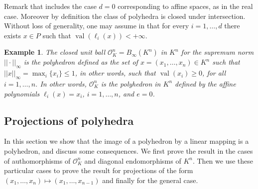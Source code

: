 \documentclass[a4paper,oneside,11pt]{article}
\newtheorem{example}[theorem]{Example}
\newcommand{\aff}[1]{{\text{aff}(#1)}} %
\newcommand{\relint}[1]{{\text{relint}(#1)}} %
\newcommand{\simone}[1]{{\color{blue} #1}} %
\DeclareMathOperator{\val}{val}
\newcommand{\OK}{\mathcal{O}_K}
\begin{document}
Remark that  includes the case $d=0$ corresponding to affine spaces, as in the real case.
Moreover by definition the class of polyhedra is closed under intersection. Without loss of generality, one may
assume in  that for every $i=1,\ldots,d$ there exists $x \in P$ such that
$\val(\ell_i(x))<+\infty$.

\begin{example}
  The \emph{closed unit ball} $\OK^n=B_\infty(K^n)$ in $K^n$ for the supremum norm $||\cdot||_{\infty}$ is the
  polyhedron defined as the set of $x=(x_1,\ldots,x_n) \in K^n$ such that $||x||_{\infty} =
  \max_i\{x_i\} \leq 1$, in other words, such that $\val(x_i) \geq 0$, for all $i=1, \ldots, n$.
  In other words, $\OK^n$ is the polyhedron in $K^n$ defined by the affine polynomials
  $\ell_i(x)=x_i$, $i=1,\ldots, n$, and $e=0$. %
\end{example}

\subsection{Projections of polyhedra}


In this section we show that the image of a polyhedron by a linear mapping is a polyhedron,
and discuss some consequences.
We first prove the result in the cases of authomorphisms of $\OK^n$ and diagonal endomorphisms of $K^n$.
Then we use these particular cases to prove the result for projections of the form
$(x_1,\dots,x_n) \mapsto (x_1,\dots, x_{n-1})$ and finally for the general case.
\end{document}
